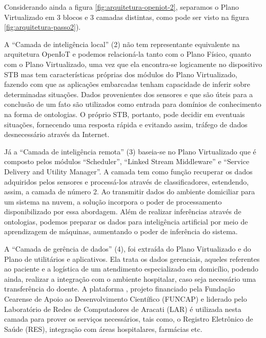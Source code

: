 
Considerando ainda a figura \ref{fig:arquitetura-openiot-2}, separamos o Plano
Virtualizado em 3 blocos e 3 camadas distintas, como pode ser visto na figura
\ref{fig:arquitetura-passo2}). 


A ``Camada de inteligência local'' (2) não tem representante equivalente na
arquitetura OpenIoT e podemos relacioná-la tanto com o Plano Físico, quanto com
o Plano Virtualizado, uma vez que ela encontra-se logicamente no dispositivo
STB mas tem características próprias dos módulos do Plano Virtualizado, 
fazendo com que as aplicações embarcadas tenham capacidade de inferir sobre
determinadas situações. Dados provenientes dos sensores e que são úteis para a
conclusão de um fato são utilizados como entrada para domínios de conhecimento
na forma de ontologias. O próprio STB, portanto, pode decidir em eventuais
situações, fornecendo uma resposta rápida e evitando assim, tráfego de dados
desnecessário através da Internet.

Já a ``Camada de inteligência remota'' (3) baseia-se no Plano Virtualizado que
é composto pelos módulos ``Scheduler'', ``Linked Stream Middleware'' e ``Service
Delivery and Utility Manager''. A camada tem como função recuperar os dados
adquiridos pelos sensores e processá-los através de classificadores,
estendendo, assim, a camada de número 2. Ao transmitir dados do ambiente
domiciliar para um sistema na nuvem, a solução incorpora o poder de
processamento disponibilizado por essa abordagem. Além de realizar inferências
através de ontologias, podemos preparar os dados para inteligência artificial
por meio de aprendizagem de máquinas, aumentando o poder de inferência do
sistema.

A ``Camada de gerência de dados'' (4), foi extraída do Plano Virtualizado e do
Plano de utilitários e aplicativos. Ela trata os dados gerenciais, aqueles
referentes ao paciente e a logística de um atendimento especializado em
domicílio, podendo ainda, realizar a integração com o ambiente hospitalar, caso
seja necessário uma transferência do doente. A plataforma \nextsaude[],
projeto financiado pela Fundação Cearense de Apoio ao Desenvolvimento Científico 
(FUNCAP) e liderado pelo Laboratório de Redes de Computadores de Aracati (LAR) 
é utilizada nesta camada para prover os serviços necessários, tais como, o 
Registro Eletrônico de Saúde (RES), integração com áreas hospitalares, farmácias etc.

